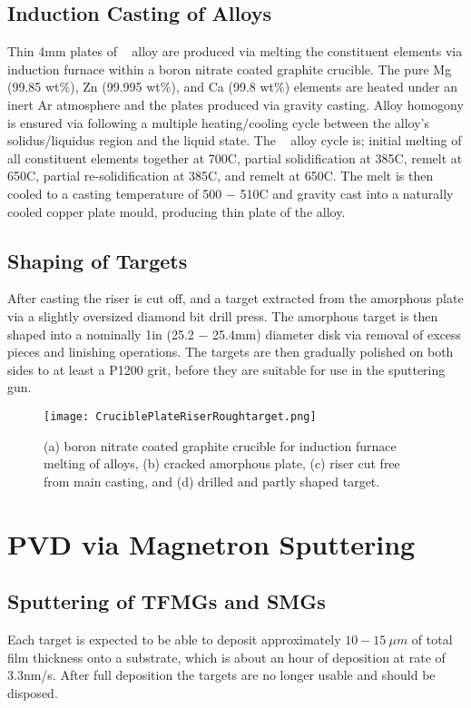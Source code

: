 \documentclass[a4paper,12pt,oneside]{report}%
\begin{document}
\subsection{Induction Casting of Alloys}
Thin 4mm plates  of \MgZnCa~ alloy are produced via melting the constituent elements via induction furnace within a boron nitrate coated graphite crucible. The pure Mg (99.85 wt\%), Zn (99.995 wt\%), and Ca (99.8 wt\%) elements are heated under an inert Ar atmosphere and the plates produced via gravity casting. Alloy homogony is ensured via following a multiple heating/cooling cycle between the alloy's solidus/liquidus region and the liquid state. The \MgZnCa~ alloy cycle is; initial melting of all constituent elements together at 700\degree C, partial solidification at 385\degree C, remelt at 650\degree C, partial re-solidification at 385\degree C, and remelt at 650\degree C. The melt is then cooled to a casting temperature of 500 $-$ 510\degree C and gravity cast into a naturally cooled copper plate mould, producing thin plate of the alloy. 

\subsection{Shaping of Targets}
After casting the riser is cut off, and a target extracted from the amorphous plate via a slightly oversized diamond bit drill press. The amorphous target is then shaped into a nominally 1in (25.2 $-$ 25.4mm) diameter disk via removal of excess pieces and linishing operations. The targets are then gradually polished on both sides to at least a P1200 grit, before they are suitable for use in the sputtering gun. 

\begin{figure}[htbp]
	\centering
	\texttt{[image: CruciblePlateRiserRoughtarget.png]}
	\caption{(a) boron nitrate coated graphite crucible  for induction furnace melting of alloys, (b) cracked amorphous plate, (c) riser cut free from main casting, and (d) drilled and partly shaped target.}
	\label{fig:CrucibleShaping}
\end{figure}

\section{PVD via Magnetron Sputtering}
\subsection{Sputtering of TFMGs and SMGs}
Each target is expected to be able to deposit approximately $10 - 15~ \mu m$ of total film thickness onto a substrate, which is about an hour of deposition at rate of 3.3nm/s. After full deposition the targets are no longer usable and should be disposed. 
\end{document}
